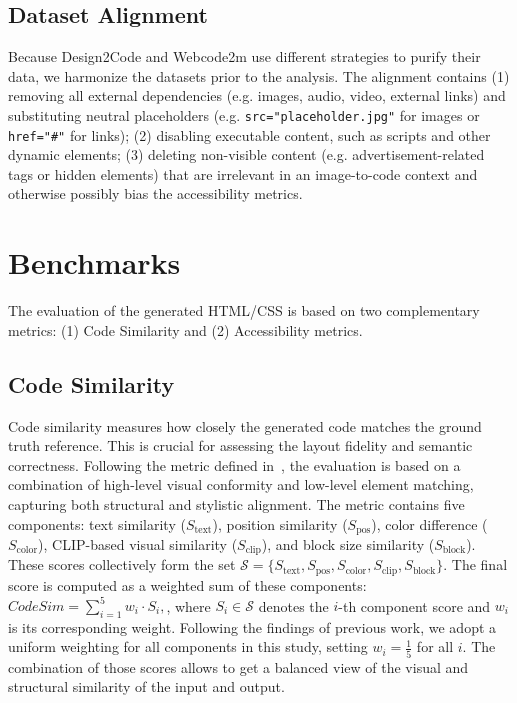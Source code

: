 \subsection{Dataset Alignment}
Because Design2Code and Webcode2m use different strategies to purify 
their data, we harmonize the datasets prior to the analysis. 
The alignment contains (1) removing all external dependencies (e.g. images, audio, 
video, external links) and substituting neutral placeholders (e.g. \texttt{src="placeholder.jpg"}
for images or \texttt{href="\#"} for links); (2) disabling executable content, 
such as scripts and other dynamic elements; (3) deleting non-visible content (e.g. 
advertisement-related tags or hidden elements) that are irrelevant in 
an image-to-code context and otherwise possibly bias 
the accessibility metrics.



\section{Benchmarks}
The evaluation of the generated HTML/CSS is based on two complementary 
metrics: (1) Code Similarity and (2) Accessibility metrics.

\subsection{Code Similarity}
Code similarity measures how closely the generated code matches the ground
truth reference. This is crucial for assessing the layout fidelity and 
semantic correctness. Following the metric defined in~\cite{si2024design2code}, 
the evaluation is based on a combination of high-level visual 
conformity and low-level element matching, capturing both 
structural and stylistic alignment. 
The metric contains five components:
text similarity (\(S_{\text{text}}\)), position similarity 
(\(S_{\text{pos}}\)), color difference (\(S_{\text{color}}\)), 
CLIP-based visual similarity (\(S_{\text{clip}}\)), 
and block size similarity (\(S_{\text{block}}\)). 
These scores collectively form the set 
\(\mathcal{S} = \{S_{\text{text}}, S_{\text{pos}}, S_{\text{color}}, S_{\text{clip}}, S_{\text{block}}\}\). 
The final score is computed as a weighted sum of these components:
\(
\textit{CodeSim} = \sum_{i=1}^{5} w_i \cdot S_i,
\),
where \(S_i \in \mathcal{S}\) denotes the \(i\)-th component score and \(w_i\) is its corresponding weight.
Following the findings of previous work, we adopt a uniform weighting for all components in this study, setting \(w_i = \frac{1}{5}\) for all \(i\).
The combination of those scores allows to get a balanced view of the visual and 
structural similarity of the input and output.



